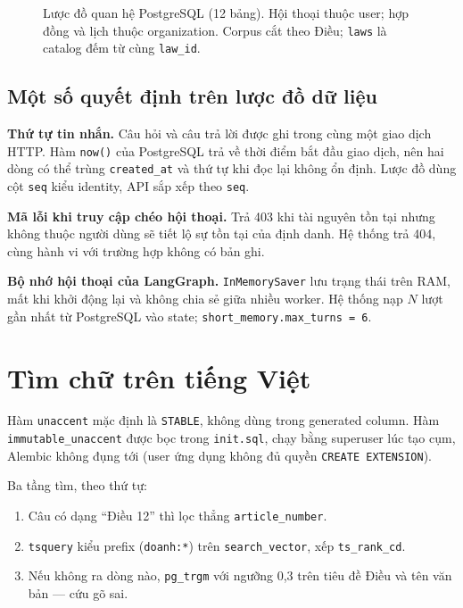 \begin{figure}[p]
\centering
\resizebox{\textwidth}{!}{\hinhCsdl}
\caption{Lược đồ quan hệ PostgreSQL (12 bảng). Hội thoại thuộc user; hợp đồng
và lịch thuộc organization. Corpus cắt theo Điều; \texttt{laws} là catalog đếm
từ cùng \texttt{law\_id}.}
\label{fig:luoc-do-csdl}
\end{figure}

\subsection{Một số quyết định trên lược đồ dữ liệu}

\textbf{Thứ tự tin nhắn.} Câu hỏi và câu trả lời được ghi trong cùng một giao
dịch HTTP. Hàm \texttt{now()} của PostgreSQL trả về thời điểm bắt đầu giao dịch,
nên hai dòng có thể trùng \texttt{created\_at} và thứ tự khi đọc lại không ổn
định. Lược đồ dùng cột \texttt{seq} kiểu identity, API sắp xếp theo
\texttt{seq}.

\textbf{Mã lỗi khi truy cập chéo hội thoại.} Trả 403 khi tài nguyên tồn tại nhưng
không thuộc người dùng sẽ tiết lộ sự tồn tại của định danh. Hệ thống trả 404,
cùng hành vi với trường hợp không có bản ghi.

\textbf{Bộ nhớ hội thoại của LangGraph.} \texttt{InMemorySaver} lưu trạng thái
trên RAM, mất khi khởi động lại và không chia sẻ giữa nhiều worker. Hệ thống nạp
$N$ lượt gần nhất từ PostgreSQL vào state;
\texttt{short\_memory.max\_turns = 6}.



\section{Tìm chữ trên tiếng Việt}

Hàm \texttt{unaccent} mặc định là \texttt{STABLE}, không dùng trong generated
column. Hàm \texttt{immutable\_unaccent} được bọc trong \texttt{init.sql}, chạy bằng
superuser lúc tạo cụm, Alembic không đụng tới (user ứng dụng không đủ quyền
\texttt{CREATE EXTENSION}).

Ba tầng tìm, theo thứ tự:

\begin{enumerate}
    \item Câu có dạng ``Điều 12'' thì lọc thẳng \texttt{article\_number}.
    \item \texttt{tsquery} kiểu prefix (\texttt{doanh:*}) trên
    \texttt{search\_vector}, xếp \texttt{ts\_rank\_cd}.
    \item Nếu không ra dòng nào, \texttt{pg\_trgm} với ngưỡng 0,3 trên tiêu đề
    Điều và tên văn bản --- cứu gõ sai.
\end{enumerate}

